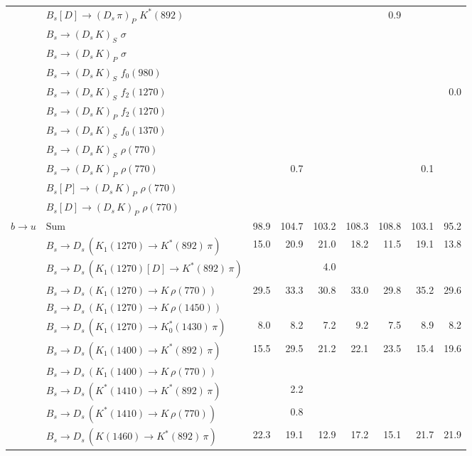 \begin{tabular}{l l  r  r  r  r  r  r  r  }
 & $B_s[D] \to ( D_s \, \pi)_{P} \, \, K^{*}(892)$ &  &  &  &  & 0.9 &  &  \\ 
 & $B_s \to ( D_s \, K)_{S} \, \, \sigma$ &  &  &  &  &  &  &  \\ 
 & $B_s \to ( D_s \, K)_{P} \, \, \sigma$ &  &  &  &  &  &  &  \\ 
 & $B_s \to ( D_s \, K)_{S} \, \, f_0(980)$ &  &  &  &  &  &  &  \\ 
 & $B_s \to ( D_s \, K)_{S} \, \, f_2(1270)$ &  &  &  &  &  &  & 0.0 \\ 
 & $B_s \to ( D_s \, K)_{P} \, \, f_2(1270)$ &  &  &  &  &  &  &  \\ 
 & $B_s \to ( D_s \, K)_{S} \, \, f_0(1370)$ &  &  &  &  &  &  &  \\ 
 & $B_s \to ( D_s \, K)_{S} \, \, \rho(770)$ &  &  &  &  &  &  &  \\ 
 & $B_s \to ( D_s \, K)_{P} \, \, \rho(770)$ &  & 0.7 &  &  &  & 0.1 &  \\ 
 & $B_s[P] \to ( D_s \, K)_{P} \, \, \rho(770)$ &  &  &  &  &  &  &  \\ 
 & $B_s[D] \to ( D_s \, K)_{P} \, \, \rho(770)$ &  &  &  &  &  &  &  \\ 
\multirow{30}{*}{$b \to u$}  & $\text{Sum}$ & 98.9 & 104.7 & 103.2 & 108.3 & 108.8 & 103.1 & 95.2 \\ 
\hline
 & $B_s \to D_s \, ( K_1(1270) \to K^{*}(892) \, \pi )$ & 15.0 & 20.9 & 21.0 & 18.2 & 11.5 & 19.1 & 13.8 \\ 
 & $B_s \to D_s \, ( K_1(1270)[D] \to K^{*}(892) \, \pi )$ &  &  & 4.0 &  &  &  &  \\ 
 & $B_s \to D_s \, ( K_1(1270) \to K \, \rho(770) )$ & 29.5 & 33.3 & 30.8 & 33.0 & 29.8 & 35.2 & 29.6 \\ 
 & $B_s \to D_s \, ( K_1(1270) \to K \, \rho(1450) )$ &  &  &  &  &  &  &  \\ 
 & $B_s \to D_s \, ( K_1(1270) \to K^{*}_{0}(1430) \, \pi )$ & 8.0 & 8.2 & 7.2 & 9.2 & 7.5 & 8.9 & 8.2 \\ 
 & $B_s \to D_s \, ( K_1(1400) \to K^{*}(892) \, \pi )$ & 15.5 & 29.5 & 21.2 & 22.1 & 23.5 & 15.4 & 19.6 \\ 
 & $B_s \to D_s \, ( K_1(1400) \to K \, \rho(770) )$ &  &  &  &  &  &  &  \\ 
 & $B_s \to D_s \, ( K^{*}(1410) \to K^{*}(892) \, \pi )$ &  & 2.2 &  &  &  &  &  \\ 
 & $B_s \to D_s \, ( K^{*}(1410) \to K \, \rho(770) )$ &  & 0.8 &  &  &  &  &  \\ 
 & $B_s \to D_s \, ( K(1460) \to K^{*}(892) \, \pi )$ & 22.3 & 19.1 & 12.9 & 17.2 & 15.1 & 21.7 & 21.9 \\ 

\end{tabular}
